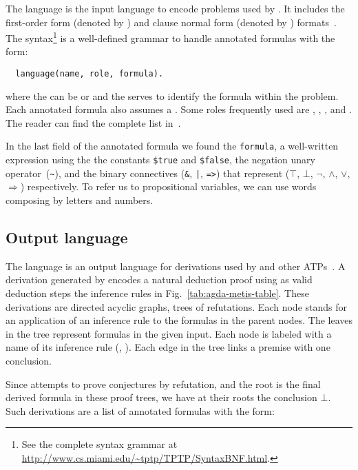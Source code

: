 \documentclass[../paper.tex]{subfiles}
\begin{document}
The \TPTP language is the input language to encode problems used by \Metis.
It includes the first-order form (denoted by ) and clause normal
form (denoted by ) formats~\cite{sutcliffe2009}.
The \TPTP syntax\footnote{See the complete syntax grammar
at \url{http://www.cs.miami.edu/~tptp/TPTP/SyntaxBNF.html}.} is a
well-defined grammar to handle annotated formulas with the form:
\begin{verbatim}
  language(name, role, formula).
\end{verbatim}
where the  can be  or  and the  serves
to identify the formula within the problem. Each
annotated formula also assumes a . Some roles frequently used are ,
, ,  and . The reader
can find the complete list in~\cite{sutcliffe2009}.

In the last field of the annotated formula we found the \texttt{formula},
a well-written expression using the
the constants \verb!$true! and \verb!$false!, the negation unary
operator~(\verb!~!), and the binary connectives
(\verb!&!, \verb!|!, \verb!=>!) that represent
($⊤$, $⊥$, $¬$, $∧$, $∨$, $⇒$) respectively.
To refer us to propositional variables, we can use words composing by letters and numbers.


\subsection{Output language}
\label{ssec:output-language}

The \TSTP language is an output language for derivations used by
\Metis and other ATPs~\cite{Sutcliffe-Schulz-Claessen-VanGelder-2006}.
A \TSTP  derivation generated by \Metis encodes a natural
deduction proof using as valid deduction steps the inference rules
in Fig.~\ref{tab:agda-metis-table}.
These derivations are directed acyclic graphs, trees of refutations.
Each node stands for an application of an inference rule to the formulas
in the parent nodes. The leaves in the tree represent formulas in the given
\TPTP input. Each node is labeled with a name of its inference rule (\eg, \canonicalize).
Each edge in the tree links a premise with one conclusion.

Since \Metis attempts to prove conjectures by refutation, and the root
is the final derived formula in these proof trees,  we have at their
roots the conclusion $⊥$. Such derivations are a list of annotated
formulas with the form:
\end{document}
